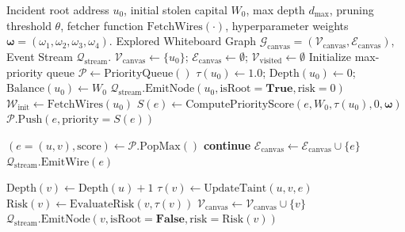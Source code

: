 \begin{algorithm}[H]
\caption{Priority Heuristic Traversal Algorithm}
\label{alg:priority_search}
\begin{algorithmic}[1]
\Require Incident root address $u_0$, initial stolen capital $W_0$, max depth $d_{\max}$, pruning threshold $\theta$, fetcher function $\text{FetchWires}(\cdot)$, hyperparameter weights $\mathbf{\omega} = (\omega_1, \omega_2, \omega_3, \omega_4)$.
\Ensure Explored Whiteboard Graph $\mathcal{G}_{\text{canvas}} = (\mathcal{V}_{\text{canvas}}, \mathcal{E}_{\text{canvas}})$, Event Stream $\mathcal{Q}_{\text{stream}}$.
\State $\mathcal{V}_{\text{canvas}} \gets \{u_0\}$; $\mathcal{E}_{\text{canvas}} \gets \emptyset$; $\mathcal{V}_{\text{visited}} \gets \emptyset$
\State Initialize max-priority queue $\mathcal{P} \gets \text{PriorityQueue}()$
\State $\tau(u_0) \gets 1.0$; $\text{Depth}(u_0) \gets 0$; $\text{Balance}(u_0) \gets W_0$
\State $\mathcal{Q}_{\text{stream}}.\text{EmitNode}(u_0, \text{isRoot}=\mathbf{True}, \text{risk}=0)$
\State $\mathcal{W}_{\text{init}} \gets \text{FetchWires}(u_0)$
    \State $S(e) \gets \text{ComputePriorityScore}(e, W_0, \tau(u_0), 0, \mathbf{\omega})$
        \State $\mathcal{P}.\text{Push}(e, \text{priority}=S(e))$
    \EndIf
\EndFor

    \State $(e = (u, v), \text{score}) \gets \mathcal{P}.\text{PopMax}()$
        \State \textbf{continue}
    \EndIf
    \State $\mathcal{E}_{\text{canvas}} \gets \mathcal{E}_{\text{canvas}} \cup \{e\}$
    \State $\mathcal{Q}_{\text{stream}}.\text{EmitWire}(e)$
    
        \State $\text{Depth}(v) \gets \text{Depth}(u) + 1$
        \State $\tau(v) \gets \text{UpdateTaint}(u, v, e)$ 
        \State $\text{Risk}(v) \gets \text{EvaluateRisk}(v, \tau(v))$ 
        \State $\mathcal{V}_{\text{canvas}} \gets \mathcal{V}_{\text{canvas}} \cup \{v\}$
        \State $\mathcal{Q}_{\text{stream}}.\text{EmitNode}(v, \text{isRoot}=\mathbf{False}, \text{risk}=\text{Risk}(v))$
    \EndIf


\end{algorithmic}
\end{algorithm}
